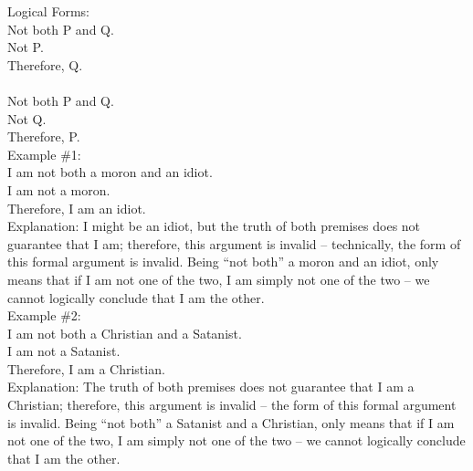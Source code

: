 \documentclass[a4paper,12pt,single,pdftex]{scrartcl}
\begin{document}
    
      Logical Forms:
    \\

    
      Not both P and Q.
    \\

    
      Not P.
    \\

    
      Therefore, Q.
    \\

    
       
    \\

    
      Not both P and Q.
    \\

    
      Not Q.
    \\

    
      Therefore, P.
    \\

    
      Example \#1:
    \\

    
      I am not both a moron and an idiot.
    \\

    
      I am not a moron.
    \\

    
      Therefore, I am an idiot.
    \\

    
      Explanation:  I might be an idiot, but the truth of both premises does not guarantee that I am; therefore, this argument is invalid -- technically, the form of this formal argument is invalid.  Being “not both” a moron and an idiot, only means that if I am not one of the two, I am simply not one of the two -- we cannot logically conclude that I am the other.
    \\

    
      Example \#2:
    \\

    
      I am not both a Christian and a Satanist.
    \\

    
      I am not a Satanist.
    \\

    
      Therefore, I am a Christian.
    \\

    
      Explanation:  The truth of both premises does not guarantee that I am a Christian; therefore, this argument is invalid -- the form of this formal argument is invalid.  Being “not both” a Satanist and a Christian, only means that if I am not one of the two, I am simply not one of the two -- we cannot logically conclude that I am the other.
    \\
\end{document}
